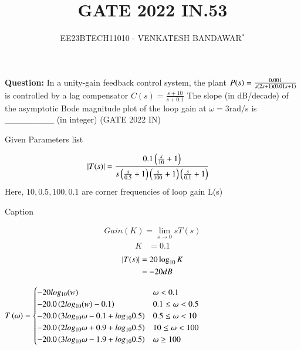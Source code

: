 \documentclass[journal,12pt,twocolumn]{IEEEtran}
\theoremstyle{remark}
\begin{document}

\vspace{3cm}

\title{GATE 2022 IN.53}
\author{EE23BTECH11010 - VENKATESH BANDAWAR$^{*}$%
}
\maketitle
\newpage
\bigskip
\textbf{Question:} In a unity-gain feedback control system, the plant
$P(s) = \frac{0.001}{s\left(2s+1\right)\left(0.01s+1\right)}$
is controlled by a lag compensator
$C(s) = \frac{s+10}{s+0.1}$
The slope (in dB/decade) of the asymptotic Bode magnitude plot of the loop gain
at $\omega= 3 $rad/s is \_\_\_\_\_\_\_\_ (in integer)
\hfill(GATE 2022 IN)\\
\solution
\begin{table}[!h]
    \centering
    
    \caption{Given Parameters list}
    \label{tab:Given Parameters list.gate2022.IN.53}
\end{table}
\begin{align}
    \left\vert T(s)\right\vert &= \frac{0.1\left(\frac{s}{10}+1\right)}{s\left(\frac{s}{0.5}+1\right)\left(\frac{s}{100}+1\right)\left(\frac{s}{0.1}+1\right)}\label{eqn of loop gain.gate2022.IN.53}
\end{align}
Here, $10,0.5,100,0.1$ are corner frequencies of loop gain L(s) 

\begin{table}[!h]
    \centering
    
    \caption{Caption}
    \label{tab:corner frequency.gate2022.IN.53}
\end{table}

\begin{align}
    Gain(K) = \lim_{s\rightarrow 0} sT(s)
\end{align}
\begin{align}
    K &= 0.1
\end{align}
\begin{align}
    \left\vert T(s)\right\vert &= 20\log_{10} K\\
    &= -20 dB
\end{align}

$T\left(\omega\right) = \begin{cases} 
    -20 log_{10}(w) &  \omega < 0.1 \\
    -20.0 \left(2log_{10}(w) - 0.1\right)  &  0.1 \leq \omega < 0.5 \\
    -20.0 \left(3log_{10}{\omega} - 0.1 + log_{10}{0.5}\right)  &  0.5 \leq \omega < 10 \\
    -20.0 \left(2log_{10}{\omega} + 0.9 + log_{10}{0.5}\right)  &  10 \leq \omega < 100 \\
    -20.0 \left(3log_{10}{\omega} - 1.9 + log_{10}{0.5}\right)  &  \omega \geq 100 \\
\end{cases}$
\end{document}
